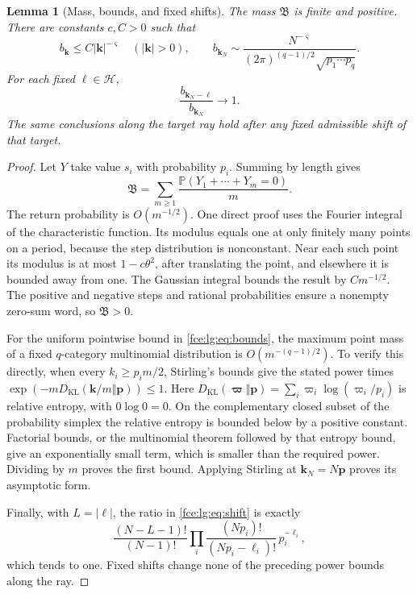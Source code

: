 \documentclass[11pt,a4paper]{article}
\numberwithin{equation}{section}
\newtheorem{lemma}[theorem]{Lemma}
\theoremstyle{definition}\newtheorem{definition}[theorem]{Definition}
\theoremstyle{remark}\newtheorem{remark}[theorem]{Remark}
\newcommand{\Prob}{\mathbb P}
\newcommand{\Bmass}{\mathfrak B}
\begin{document}
\begin{lemma}[Mass, bounds, and fixed shifts]\label{fce:lg:lem:bounds}
The mass $\Bmass$ is finite and positive. There are constants $c,C>0$ such
that
\begin{equation}\label{fce:lg:eq:bounds}
 b_{\boldsymbol k}\le C|\boldsymbol k|^{-\varsigma}\quad(|\boldsymbol k|>0),\qquad
 b_{\boldsymbol k_N}\sim
 \frac{N^{-\varsigma}}{(2\pi)^{(q-1)/2}\sqrt{p_1\cdots p_q}}.
\end{equation}
For each fixed $\boldsymbol\ell\in\mathcal H$,
\begin{equation}\label{fce:lg:eq:shift}
 \frac{b_{\boldsymbol k_N-\boldsymbol\ell}}{b_{\boldsymbol k_N}}\longrightarrow1.
\end{equation}
The same conclusions along the target ray hold after any fixed admissible
shift of that target.
\end{lemma}
\begin{proof}
Let $Y$ take value $s_i$ with probability $p_i$. Summing by length gives
\[
 \Bmass=\sum_{m\ge1}\frac{\Prob(Y_1+\cdots+Y_m=0)}m.
\]
The return probability is $O(m^{-1/2})$. One direct proof uses the
Fourier integral of the characteristic function. Its modulus equals one at
only finitely many points on a period, because the step distribution is
nonconstant. Near each such point its modulus is at most $1-c\theta^2$,
after translating the point, and elsewhere it is bounded away from one.
The Gaussian integral bounds the result by $Cm^{-1/2}$. The positive and
negative steps and rational probabilities ensure a nonempty zero-sum word,
so $\Bmass>0$.

For the uniform pointwise bound in \eqref{fce:lg:eq:bounds}, the maximum
point mass of a fixed $q$-category multinomial distribution is
$O(m^{-(q-1)/2})$. To verify this directly, when every
$k_i\ge p_i m/2$, Stirling's bounds give the stated power times
$\exp(-mD_{\mathrm{KL}}(\boldsymbol k/m\Vert\boldsymbol p))\le1$. Here
$D_{\mathrm{KL}}(\boldsymbol\varpi\Vert\boldsymbol p)
=\sum_i \varpi_i\log(\varpi_i/p_i)$ is relative entropy, with $0\log0=0$.
On the complementary closed subset of the probability simplex the relative
entropy is bounded below by a positive constant. Factorial bounds, or the
multinomial theorem followed by that entropy bound, give an exponentially
small term, which is smaller than the required power. Dividing by $m$
proves the first bound. Applying Stirling at $\boldsymbol k_N=N\boldsymbol p$
proves its asymptotic form.

Finally, with $L=|\boldsymbol\ell|$, the ratio in \eqref{fce:lg:eq:shift} is
exactly
\[
 \frac{(N-L-1)!}{(N-1)!}
 \prod_i\frac{(Np_i)!}{(Np_i-\ell_i)!}\,p_i^{-\ell_i},
\]
which tends to one. Fixed shifts change none of the preceding power bounds
along the ray.
\end{proof}
\end{document}
